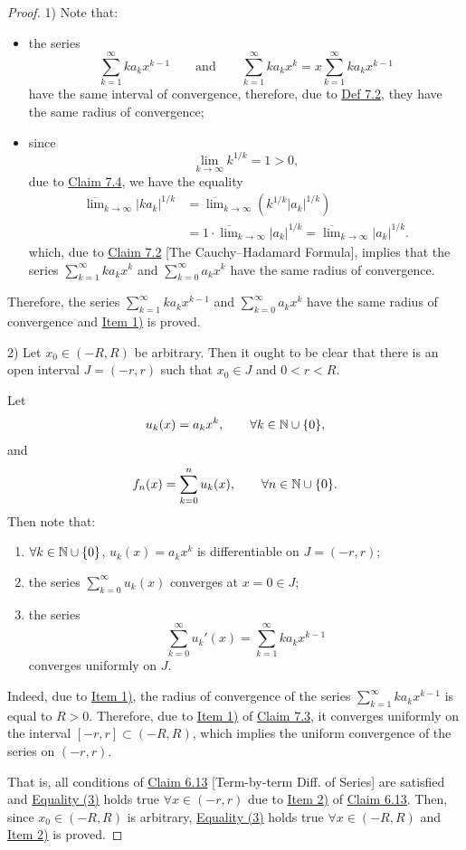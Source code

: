 \begin{proof}
1) Note that:
\begin{itemize}
    \item the series
    \[
    \sum_{k=1}^{\infty}ka_kx^{k-1}
    \qquad\text{and}\qquad
    \sum_{k=1}^{\infty}ka_kx^k
    =
    x\sum_{k=1}^{\infty}ka_kx^{k-1}
    \]
    have the same interval of convergence, therefore, due to \hyperref[def:7.2]{Def 7.2}, they have the same radius of convergence;

    \item since
    \[
    \lim_{k\to\infty}k^{1/k}=1>0,
    \]
    due to \hyperref[claim:7.4]{Claim 7.4}, we have the equality
    \[
    \begin{aligned}
    \overline{\lim}_{k\to\infty}|ka_k|^{1/k}
    &=\overline{\lim}_{k\to\infty}\left(k^{1/k}|a_k|^{1/k}\right)\\
    &=1\cdot\overline{\lim}_{k\to\infty}|a_k|^{1/k}
    =\overline{\lim}_{k\to\infty}|a_k|^{1/k}.
    \end{aligned}
    \]
    which, due to \hyperref[claim:7.2]{Claim 7.2} [The Cauchy--Hadamard Formula], implies that the series $\sum_{k=1}^{\infty}ka_kx^k$ and $\sum_{k=0}^{\infty}a_kx^k$ have the same radius of convergence.
\end{itemize}
Therefore, the series $\sum_{k=1}^{\infty}ka_kx^{k-1}$ and $\sum_{k=0}^{\infty}a_kx^k$ have the same radius of convergence and \hyperref[item:claim:7.5:1]{Item 1)} is proved.

2) Let $x_0\in(-R,R)$ be arbitrary. Then it ought to be clear that there is an open interval $J=(-r,r)$ such that $x_0\in J$ and $0<r<R$.

Let
\[
u_k(x)=a_kx^k,\qquad \forall k\in\mathbb{N}\cup\{0\},
\]
and
\[
f_n(x)=\sum_{k=0}^{n}u_k(x),\qquad \forall n\in\mathbb{N}\cup\{0\}.
\]
Then note that:
\begin{enumerate}[label=\alph*)]
    \item $\forall k\in\mathbb{N}\cup\{0\}$, $u_k(x)=a_kx^k$ is differentiable on $J=(-r,r)$;

    \item the series $\sum_{k=0}^{\infty}u_k(x)$ converges at $x=0\in J$;

    \item the series
    \[
    \sum_{k=0}^{\infty}u_k'(x)
    =
    \sum_{k=1}^{\infty}ka_kx^{k-1}
    \]
    converges uniformly on $J$.
\end{enumerate}
Indeed, due to \hyperref[item:claim:7.5:1]{Item 1)}, the radius of convergence of the series $\sum_{k=1}^{\infty}ka_kx^{k-1}$ is equal to $R>0$.
Therefore, due to \hyperref[item:claim:7.3:1]{Item 1)} of \hyperref[claim:7.3]{Claim 7.3}, it converges uniformly on the interval $[-r,r]\subset(-R,R)$, which implies the uniform convergence of the series on $(-r,r)$.

That is, all conditions of \hyperref[claim:6.13]{Claim 6.13} [Term-by-term Diff. of Series] are satisfied and \hyperref[eq:7:3:1]{Equality (3)} holds true $\forall x\in(-r,r)$ due to \hyperref[item:claim:6.13:2]{Item 2)} of \hyperref[claim:6.13]{Claim 6.13}.
Then, since $x_0\in(-R,R)$ is arbitrary, \hyperref[eq:7:3:1]{Equality (3)} holds true $\forall x\in(-R,R)$ and \hyperref[item:claim:7.5:2]{Item 2)} is proved.
\end{proof}

